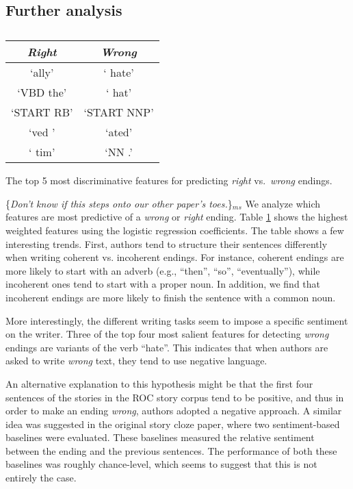 \documentclass[11pt]{article}
\newcommand{\ms}[1]{{\color{cyan}\{\textit{#1}\}$_{ms}$}}
\begin{document}
\subsection{Further analysis} 

\begin{table}[h]
\begin{center}
\begin{tabular}{|c|c|} \hline
\textit{\textbf{Right}} & \textit{\textbf{Wrong}}\\ \hline
`ally' & ` hate'\\ \hline
`VBD the' & ` hat'\\ \hline
`START RB' & `START NNP'\\ \hline
`ved ' & `ated'\\ \hline
` tim' & `NN .'\\ \hline

\end{tabular}
\end{center}
\caption{\label{exp1_features}}
The top 5 most discriminative features for predicting {\it right} vs.~{\it wrong} endings.\end{table}

\ms{Don't know if this steps onto our other paper's toes.}
We analyze which features are most predictive of a \textit{wrong} or \textit{right} ending.
Table \ref{exp1_features} shows the highest weighted features using the logistic regression coefficients. 
The table shows a few interesting trends. 
First, authors tend to structure their sentences differently when writing {coherent}  vs. {incoherent} endings.
For instance, {coherent} endings are more likely to start with an adverb (e.g., ``then'', ``so'', ``eventually''), while {incoherent} ones tend to start with a proper noun.
In addition, we find that {incoherent} endings are more likely to
finish the sentence with a common noun.  %

More interestingly, the different writing tasks seem to impose a specific sentiment on the writer. 
Three of the top four most salient features for detecting {\it wrong} endings are variants of the verb ``hate''.
This indicates that when authors are asked to write {\it wrong} text, they tend to use negative language.

An alternative explanation to this hypothesis might be that the first four sentences of the stories in the ROC story corpus tend to be positive, and thus in order to make an ending {\it wrong}, authors adopted a negative approach. 
A similar idea was suggested in the original story cloze paper, where two sentiment-based baselines were evaluated. 
These baselines measured the relative sentiment between the ending and the previous sentences.
The performance of both these baselines was roughly chance-level, which seems to suggest that this is not entirely the case.
\end{document}
